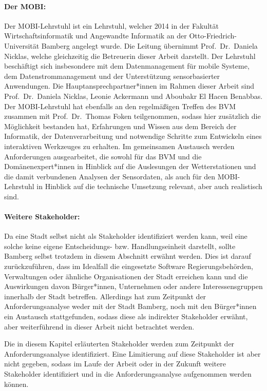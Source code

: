 \paragraph{Der \ac{MOBI}:}
Der \ac{MOBI}-Lehrstuhl ist ein Lehrstuhl, welcher 2014 in der Fakultät Wirtschaftsinformatik und Angewandte Informatik an der Otto-Friedrich-Universität Bamberg angelegt wurde. Die Leitung übernimmt Prof.\ Dr.\ Daniela Nicklas, welche gleichzeitig die Betreuerin dieser Arbeit darstellt. Der Lehrstuhl beschäftigt sich insbesondere mit dem Datenmanagement für mobile Systeme, dem Datenstrommanagement und der Unterstützung sensorbasierter Anwendungen. Die Hauptansprechpartner*innen im Rahmen dieser Arbeit sind Prof.\ Dr.\ Daniela Nicklas, Leonie Ackermann und Aboubakr El Hacen Benabbas. \\ Der \ac{MOBI}-Lehrstuhl hat ebenfalls an den regelmäßigen Treffen des \ac{BVM} zusammen mit Prof.\ Dr.\ Thomas Foken teilgenommen, sodass hier zusätzlich die Möglichkeit bestanden hat, Erfahrungen und Wissen aus dem Bereich der Informatik, der Datenverarbeitung und notwendige Schritte zum Entwickeln eines interaktiven Werkzeuges zu erhalten. Im gemeinsamen Austausch werden Anforderungen ausgearbeitet, die sowohl für das \ac{BVM} und die Domänenexpert*innen in Hinblick auf die Auslesungen der Wetterstationen und die damit verbundenen Analysen der Sensordaten, als auch für den \ac{MOBI}-Lehrstuhl in Hinblick auf die technische Umsetzung relevant, aber auch realistisch sind.

\paragraph{Weitere Stakeholder:}
Da eine Stadt selbst nicht als Stakeholder identifiziert werden kann, weil eine solche keine eigene Entscheidungs- bzw. Handlungseinheit darstellt, sollte Bamberg selbst trotzdem in diesem Abschnitt erwähnt werden. Dies ist darauf zurückzuführen, dass im Idealfall die eingesetzte Software Regierungsbehörden, Verwaltungen oder ähnliche Organisationen der Stadt erreichen kann und die Auswirkungen davon Bürger*innen, Unternehmen oder andere Interessensgruppen innerhalb der Stadt betreffen. Allerdings hat zum Zeitpunkt der Anforderungsanalyse weder mit der Stadt Bamberg, noch mit den Bürger*innen ein Austausch stattgefunden, sodass diese als indirekter Stakeholder erwähnt, aber weiterführend in dieser Arbeit nicht betrachtet werden.

Die in diesem Kapitel erläuterten Stakeholder werden zum Zeitpunkt der Anforderungsanalyse identifiziert. Eine Limitierung auf diese Stakeholder ist aber nicht gegeben, sodass im Laufe der Arbeit oder in der Zukunft weitere Stakeholder identifiziert und in die Anforderungsanalyse aufgenommen werden können.

